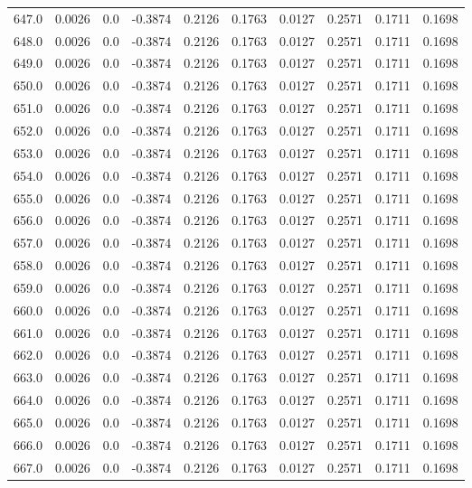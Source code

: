 \begin{longtable}{lrrrrrrrrr}
647.0 & 0.0026 & 0.0 & -0.3874 & 0.2126 & 0.1763 & 0.0127 & 0.2571 & 0.1711 & 0.1698 \\
648.0 & 0.0026 & 0.0 & -0.3874 & 0.2126 & 0.1763 & 0.0127 & 0.2571 & 0.1711 & 0.1698 \\
649.0 & 0.0026 & 0.0 & -0.3874 & 0.2126 & 0.1763 & 0.0127 & 0.2571 & 0.1711 & 0.1698 \\
650.0 & 0.0026 & 0.0 & -0.3874 & 0.2126 & 0.1763 & 0.0127 & 0.2571 & 0.1711 & 0.1698 \\
651.0 & 0.0026 & 0.0 & -0.3874 & 0.2126 & 0.1763 & 0.0127 & 0.2571 & 0.1711 & 0.1698 \\
652.0 & 0.0026 & 0.0 & -0.3874 & 0.2126 & 0.1763 & 0.0127 & 0.2571 & 0.1711 & 0.1698 \\
653.0 & 0.0026 & 0.0 & -0.3874 & 0.2126 & 0.1763 & 0.0127 & 0.2571 & 0.1711 & 0.1698 \\
654.0 & 0.0026 & 0.0 & -0.3874 & 0.2126 & 0.1763 & 0.0127 & 0.2571 & 0.1711 & 0.1698 \\
655.0 & 0.0026 & 0.0 & -0.3874 & 0.2126 & 0.1763 & 0.0127 & 0.2571 & 0.1711 & 0.1698 \\
656.0 & 0.0026 & 0.0 & -0.3874 & 0.2126 & 0.1763 & 0.0127 & 0.2571 & 0.1711 & 0.1698 \\
657.0 & 0.0026 & 0.0 & -0.3874 & 0.2126 & 0.1763 & 0.0127 & 0.2571 & 0.1711 & 0.1698 \\
658.0 & 0.0026 & 0.0 & -0.3874 & 0.2126 & 0.1763 & 0.0127 & 0.2571 & 0.1711 & 0.1698 \\
659.0 & 0.0026 & 0.0 & -0.3874 & 0.2126 & 0.1763 & 0.0127 & 0.2571 & 0.1711 & 0.1698 \\
660.0 & 0.0026 & 0.0 & -0.3874 & 0.2126 & 0.1763 & 0.0127 & 0.2571 & 0.1711 & 0.1698 \\
661.0 & 0.0026 & 0.0 & -0.3874 & 0.2126 & 0.1763 & 0.0127 & 0.2571 & 0.1711 & 0.1698 \\
662.0 & 0.0026 & 0.0 & -0.3874 & 0.2126 & 0.1763 & 0.0127 & 0.2571 & 0.1711 & 0.1698 \\
663.0 & 0.0026 & 0.0 & -0.3874 & 0.2126 & 0.1763 & 0.0127 & 0.2571 & 0.1711 & 0.1698 \\
664.0 & 0.0026 & 0.0 & -0.3874 & 0.2126 & 0.1763 & 0.0127 & 0.2571 & 0.1711 & 0.1698 \\
665.0 & 0.0026 & 0.0 & -0.3874 & 0.2126 & 0.1763 & 0.0127 & 0.2571 & 0.1711 & 0.1698 \\
666.0 & 0.0026 & 0.0 & -0.3874 & 0.2126 & 0.1763 & 0.0127 & 0.2571 & 0.1711 & 0.1698 \\
667.0 & 0.0026 & 0.0 & -0.3874 & 0.2126 & 0.1763 & 0.0127 & 0.2571 & 0.1711 & 0.1698 \\

\end{longtable}
